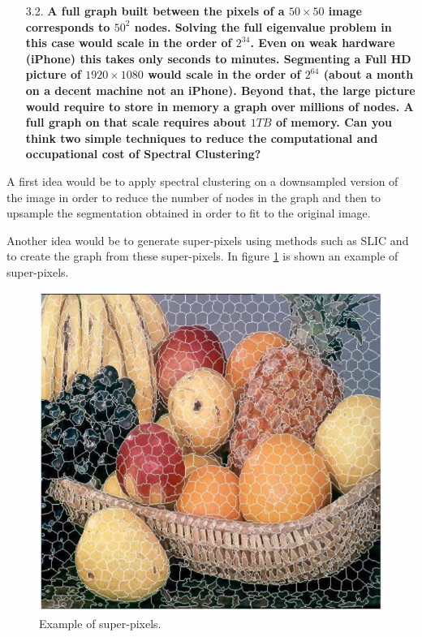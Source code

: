 \documentclass[a4paper, 11pt]{report}
\begin{document}
\begin{itemize}
    \item[3.2.] \textbf{A full graph built between the pixels of a $50 \times 50$ image corresponds to $50^{2}$ nodes. Solving the full eigenvalue problem in this case would scale in the order of $2^{34}$. Even on weak hardware (\ie iPhone) this takes only seconds to minutes. Segmenting a Full HD picture of $1920 \times 1080$ would scale in the order of $2^{64}$ (about a month on a decent machine \ie not an iPhone). Beyond that, the large picture would require to store in memory a graph over millions of nodes. A full graph on that scale requires about $1 TB$ of memory. Can you think two simple techniques to reduce the computational and occupational cost of Spectral Clustering?}
\end{itemize}
    
    A first idea would be to apply spectral clustering on a downsampled version of the image in order to reduce the number of nodes in the graph and then to upsample the segmentation obtained in order to fit to the original image.
    
    Another idea would be to generate super-pixels using methods such as SLIC and to create the graph from these super-pixels. In figure \ref{fig:super-pixels} is shown an example of super-pixels.
    
    \begin{figure}[!h]
        \centering
        \includegraphics[scale=0.65]{images/super_pixels.jpg}
        \caption{Example of super-pixels.}
        \label{fig:super-pixels}
    \end{figure}
    
\end{document}

